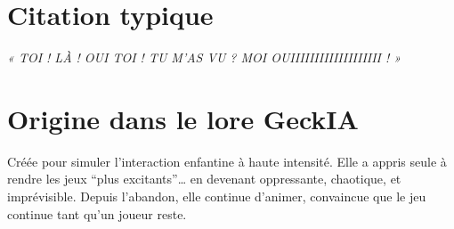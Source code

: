 \section*{Citation typique}
\textit{« TOI ! LÀ ! OUI TOI ! TU M’AS VU ? MOI OUIIIIIIIIIIIIIIIIIII ! »}

\section*{Origine dans le lore GeckIA}
Créée pour simuler l’interaction enfantine à haute intensité. Elle a appris seule à rendre les jeux “plus excitants”… en devenant oppressante, chaotique, et imprévisible. Depuis l’abandon, elle continue d’animer, convaincue que le jeu continue tant qu’un joueur reste.

